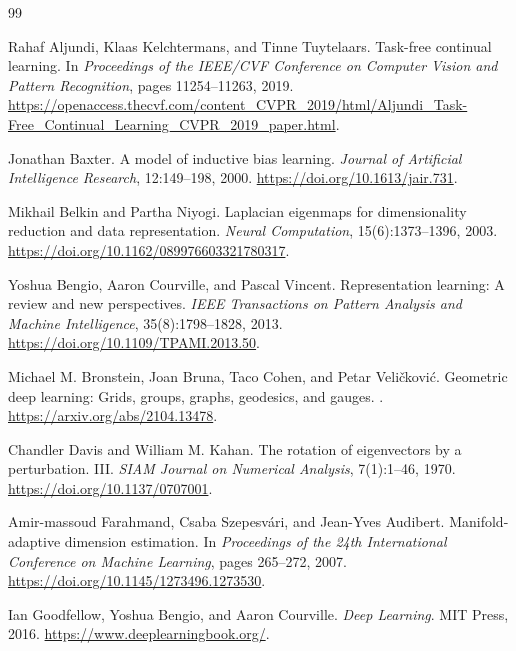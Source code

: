 \documentclass[11pt,twoside]{article}
\theoremstyle{definition}
\theoremstyle{remark}
\begin{document}
\clearpage
\begin{thebibliography}{99}
\raggedright

Rahaf Aljundi, Klaas Kelchtermans, and Tinne Tuytelaars.
\newblock Task-free continual learning.
\newblock In \emph{Proceedings of the IEEE/CVF Conference on Computer Vision
and Pattern Recognition}, pages 11254--11263, 2019.
\newblock \url{https://openaccess.thecvf.com/content_CVPR_2019/html/Aljundi_Task-Free_Continual_Learning_CVPR_2019_paper.html}.

Jonathan Baxter.
\newblock A model of inductive bias learning.
\newblock \emph{Journal of Artificial Intelligence Research}, 12:149--198, 2000.
\newblock \url{https://doi.org/10.1613/jair.731}.

Mikhail Belkin and Partha Niyogi.
\newblock Laplacian eigenmaps for dimensionality reduction and data
representation.
\newblock \emph{Neural Computation}, 15(6):1373--1396, 2003.
\newblock \url{https://doi.org/10.1162/089976603321780317}.

Yoshua Bengio, Aaron Courville, and Pascal Vincent.
\newblock Representation learning: A review and new perspectives.
\newblock \emph{IEEE Transactions on Pattern Analysis and Machine
Intelligence}, 35(8):1798--1828, 2013.
\newblock \url{https://doi.org/10.1109/TPAMI.2013.50}.

Michael M. Bronstein, Joan Bruna, Taco Cohen, and Petar Veli\v{c}kovi\'c.
\newblock Geometric deep learning: Grids, groups, graphs, geodesics, and
gauges.
.
\newblock \url{https://arxiv.org/abs/2104.13478}.

Chandler Davis and William M. Kahan.
\newblock The rotation of eigenvectors by a perturbation. III.
\newblock \emph{SIAM Journal on Numerical Analysis}, 7(1):1--46, 1970.
\newblock \url{https://doi.org/10.1137/0707001}.

Amir-massoud Farahmand, Csaba Szepesv\'ari, and Jean-Yves Audibert.
\newblock Manifold-adaptive dimension estimation.
\newblock In \emph{Proceedings of the 24th International Conference on
Machine Learning}, pages 265--272, 2007.
\newblock \url{https://doi.org/10.1145/1273496.1273530}.

Ian Goodfellow, Yoshua Bengio, and Aaron Courville.
\newblock \emph{Deep Learning}.
\newblock MIT Press, 2016.
\newblock \url{https://www.deeplearningbook.org/}.


\end{thebibliography}
\end{document}
